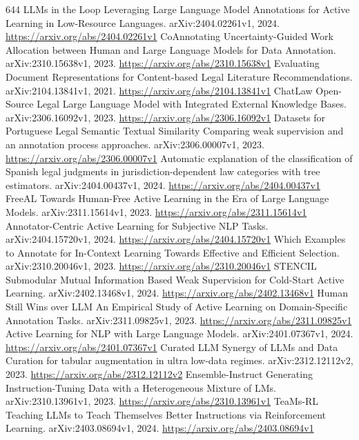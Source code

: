 \documentclass[11pt]{article}
\begin{document}
\begin{thebibliography}{644}
 LLMs in the Loop Leveraging Large Language Model Annotations for Active Learning in Low-Resource Languages. arXiv:2404.02261v1, 2024. \url{https://arxiv.org/abs/2404.02261v1}
 CoAnnotating Uncertainty-Guided Work Allocation between Human and Large Language Models for Data Annotation. arXiv:2310.15638v1, 2023. \url{https://arxiv.org/abs/2310.15638v1}
 Evaluating Document Representations for Content-based Legal Literature Recommendations. arXiv:2104.13841v1, 2021. \url{https://arxiv.org/abs/2104.13841v1}
 ChatLaw Open-Source Legal Large Language Model with Integrated External Knowledge Bases. arXiv:2306.16092v1, 2023. \url{https://arxiv.org/abs/2306.16092v1}
 Datasets for Portuguese Legal Semantic Textual Similarity Comparing weak supervision and an annotation process approaches. arXiv:2306.00007v1, 2023. \url{https://arxiv.org/abs/2306.00007v1}
 Automatic explanation of the classification of Spanish legal judgments in jurisdiction-dependent law categories with tree estimators. arXiv:2404.00437v1, 2024. \url{https://arxiv.org/abs/2404.00437v1}
 FreeAL Towards Human-Free Active Learning in the Era of Large Language Models. arXiv:2311.15614v1, 2023. \url{https://arxiv.org/abs/2311.15614v1}
 Annotator-Centric Active Learning for Subjective NLP Tasks. arXiv:2404.15720v1, 2024. \url{https://arxiv.org/abs/2404.15720v1}
 Which Examples to Annotate for In-Context Learning Towards Effective and Efficient Selection. arXiv:2310.20046v1, 2023. \url{https://arxiv.org/abs/2310.20046v1}
 STENCIL Submodular Mutual Information Based Weak Supervision for Cold-Start Active Learning. arXiv:2402.13468v1, 2024. \url{https://arxiv.org/abs/2402.13468v1}
 Human Still Wins over LLM An Empirical Study of Active Learning on Domain-Specific Annotation Tasks. arXiv:2311.09825v1, 2023. \url{https://arxiv.org/abs/2311.09825v1}
 Active Learning for NLP with Large Language Models. arXiv:2401.07367v1, 2024. \url{https://arxiv.org/abs/2401.07367v1}
 Curated LLM Synergy of LLMs and Data Curation for tabular augmentation in ultra low-data regimes. arXiv:2312.12112v2, 2023. \url{https://arxiv.org/abs/2312.12112v2}
 Ensemble-Instruct Generating Instruction-Tuning Data with a Heterogeneous Mixture of LMs. arXiv:2310.13961v1, 2023. \url{https://arxiv.org/abs/2310.13961v1}
 TeaMs-RL Teaching LLMs to Teach Themselves Better Instructions via Reinforcement Learning. arXiv:2403.08694v1, 2024. \url{https://arxiv.org/abs/2403.08694v1}

\end{thebibliography}
\end{document}
